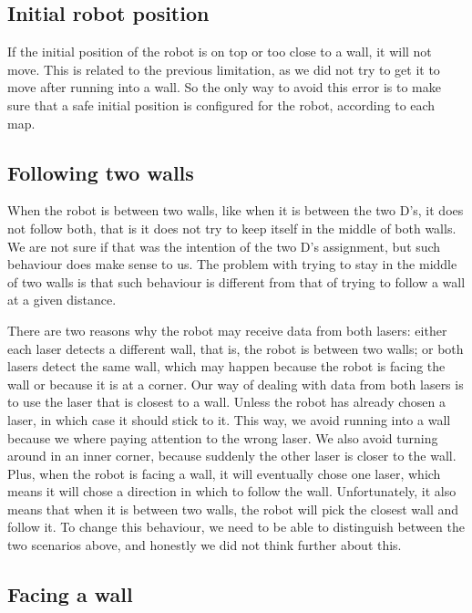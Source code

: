 \documentclass[10pt,journal,compsoc]{IEEEtran}
\begin{document}
\subsection{Initial robot position}

If the initial position of the robot is on top or too close to a wall, it will not move. This is related to the previous limitation, as we did not try to get it to move after running into a wall. So the only way to avoid this error is to make sure that a safe initial position is configured for the robot, according to each map.

\subsection{Following two walls}

When the robot is between two walls, like when it is between the two D's, it does not follow both, that is it does not try to keep itself in the middle of both walls. We are not sure if that was the intention of the two D's assignment, but such behaviour does make sense to us. The problem with trying to stay in the middle of two walls is that such behaviour is different from that of trying to follow a wall at a given distance. 

There are two reasons why the robot may receive data from both lasers: either each laser detects a different wall, that is, the robot is between two walls; or both lasers detect the same wall, which may happen because the robot is facing the wall or because it is at a corner. Our way of dealing with data from both lasers is to use the laser that is closest to a wall. Unless the robot has already chosen a laser, in which case it should stick to it. This way, we avoid running into a wall because we where paying attention to the wrong laser. We also avoid turning around in an inner corner, because suddenly the other laser is closer to the wall. Plus, when the robot is facing a wall, it will eventually chose one laser, which means it will chose a direction in which to follow the wall. Unfortunately, it also means that when it is between two walls, the robot will pick the closest wall and follow it. To change this behaviour, we need to be able to distinguish between the two scenarios above, and honestly we did not think further about this.

\subsection{Facing a wall}
\end{document}

